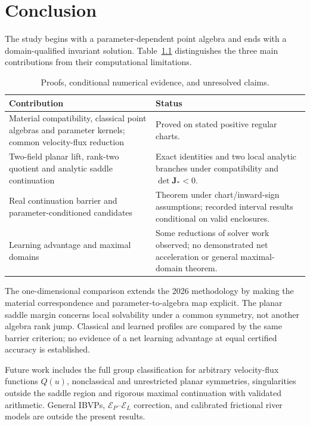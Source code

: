 \documentclass[12pt,a4paper,oneside]{report}
\numberwithin{equation}{chapter}
\theoremstyle{definition}
\theoremstyle{remark}\newtheorem{remark}[theorem]{Remark}
\newif\ifreviewmarks
\DeclareRobustCommand{\review}[1]{{\ifreviewmarks\color{authorblue}\fi #1}}
\renewcommand{\arraystretch}{1.3}
\begin{document}
\chapter{Conclusion}\label{ch:conclusion}
\review{The study begins with a parameter-dependent point algebra and ends with a domain-qualified invariant solution. Table~\ref{tab:status} distinguishes the three main contributions from their computational limitations.}
\begin{table}[!ht]\centering\small
\renewcommand{\arraystretch}{1.15}
\begin{tabularx}{\linewidth}{@{}p{.48\linewidth}X@{}}\toprule
Contribution & Status\\\midrule
\review{Material compatibility, classical point algebras and parameter kernels; common velocity-flux reduction} & \review{Proved on stated positive regular charts.}\\
\review{Two-field planar lift, rank-two quotient and analytic saddle continuation} & \review{Exact identities and two local analytic branches under compatibility and $\det\mathbf J_*<0$.}\\
\review{Real continuation barrier and parameter-conditioned candidates} & \review{Theorem under chart/inward-sign assumptions; recorded interval results conditional on valid enclosures.}\\
\review{Learning advantage and maximal domains} & \review{Some reductions of solver work observed; no demonstrated net acceleration or general maximal-domain theorem.}\\\bottomrule
\end{tabularx}
\caption[Status of the main contributions]{\review{Proofs, conditional numerical evidence, and unresolved claims.}}
\label{tab:status}
\end{table}
\review{The one-dimensional comparison extends the 2026 methodology by making the material correspondence and parameter-to-algebra map explicit. The planar saddle margin concerns local solvability under a common symmetry, not another algebra rank jump. Classical and learned profiles are compared by the same barrier criterion; no evidence of a net learning advantage at equal certified accuracy is established.}

\review{Future work includes the full group classification for arbitrary velocity-flux functions $Q(u)$, nonclassical and unrestricted planar symmetries, singularities outside the saddle region and rigorous maximal continuation with validated arithmetic. General IBVPs, $\mathcal E_P$--$\mathcal E_L$ correction, and calibrated frictional river models are outside the present results.}
\FloatBarrier
\end{document}

